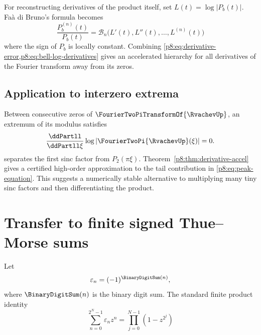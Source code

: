 \documentclass[11pt]{article}
\numberwithin{equation}{section}
\theoremstyle{definition}
\theoremstyle{remark}
\begin{document}
For reconstructing derivatives of the product itself, set $L(t)=\log|P_b(t)|$. Fa\`a di Bruno's formula becomes
\begin{equation}
\frac{P_b^{(n)}(t)}{P_b(t)}
=\mathcal B_n\bigl(L'(t),L''(t),\ldots,L^{(n)}(t)\bigr)
\label{p8:eq:bell-log-derivatives}
\end{equation}
where the sign of $P_b$ is locally constant. Combining \cref{p8:eq:derivative-error,p8:eq:bell-log-derivatives} gives an accelerated hierarchy for all derivatives of the Fourier transform away from its zeros.

\subsection{Application to interzero extrema}

Between consecutive zeros of $\FourierTwoPiTransformOf{\RvachevUp}$, an extremum of its modulus satisfies
\begin{equation}
\frac{\ddPartll}{\ddPartll\xi}\log|\FourierTwoPi{\RvachevUp}(\xi)|=0.
\label{p8:eq:peak-equation}
\end{equation}
 separates the first sinc factor from $P_2(\pi\xi)$. Theorem~\ref{p8:thm:derivative-accel} gives a certified high-order approximation to the tail contribution in \cref{p8:eq:peak-equation}. This suggests a numerically stable alternative to multiplying many tiny sinc factors and then differentiating the product.

\section{Transfer to finite signed Thue--Morse sums}
\label{p8:sec:thue-morse-transfer}

Let
\begin{equation}
\varepsilon_n=(-1)^{\BinaryDigitSum(n)},
\label{p8:eq:epsilon}
\end{equation}
where $\BinaryDigitSum(n)$ is the binary digit sum. The standard finite product identity
\begin{equation}
\sum_{n=0}^{2^N-1}\varepsilon_n z^n
=\prod_{j=0}^{N-1}(1-z^{2^j})
\label{p8:eq:TM-poly}
\end{equation}
\end{document}
